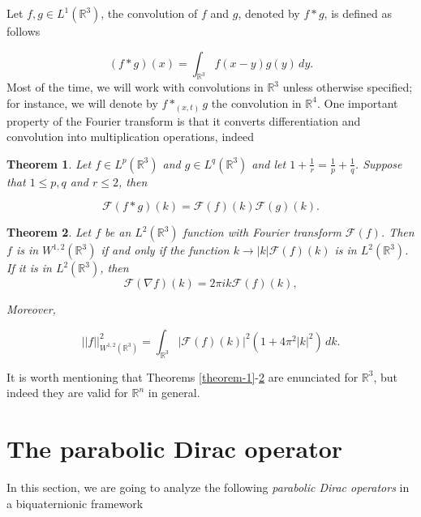 \documentclass[12pt]{article}
\newtheorem{theorem}{Theorem}
\def\R{\mathbb{R}}
\def\R{\mathbb{R}}
\newcommand{\norm}[1]{\left|\left| #1 \right|\right|}
\newcommand{\fourier}[1]{\mathcal{F}\left( #1 \right)}
\begin{document}
Let $f,g\in L^1(\R^3)$, the convolution of $f$ and $g$, denoted by $f*g$, is defined as follows

\begin{equation*}
    (f\ast g)(x)=\int_{\R^3} f(x-y)g(y)\, dy.
\end{equation*}
Most of the time, we will work with convolutions in $\mathbb{R}^3$ unless otherwise specified; for instance, we will denote by $f\ast_{(x,t)} g$ the convolution in $\mathbb{R}^4$.
One important property of the Fourier transform is that it converts differentiation and convolution into multiplication operations, indeed
\begin{theorem}{\cite[Th.\ 5.8]{lieb2001analysis}}\label{theorem-2}
    Let $f\in L^p(\R^3)$ and $g\in L^q(\R^3)$ and let $1+\tfrac{1}{r}=\frac{1}{p}+\frac{1}{q}$. Suppose that $1\leq p,q$ and $r\leq 2$, then
    
    \begin{equation}\label{eq:convolution}
        \fourier{f\ast g}(k)=\fourier{f}(k)\fourier{g}(k).
    \end{equation}    
\end{theorem}

\begin{theorem}{\cite[Th. ~7.9]{lieb2001analysis}}\label{theorem-3}
    Let $f$ be an $L^2(\R^3)$ function with Fourier transform $\fourier{f}$. Then $f$ is in $W^{1,2}(\R^3)$ if and only if the function $k\to |k|\fourier{f}(k)$ is in $L^2(\R^3)$. If it is in $L^2(\R^3)$, then
    \begin{equation}\label{eq:action-gradient}
        \fourier{\nabla f}(k)=2\pi ik\fourier{f}(k),
    \end{equation}
    
    Moreover,
    
    \begin{equation*}
        \norm{f}^2_{W^{1,2}(\R^3)}=\int_{\R^3}|\fourier{f}(k)|^2(1+4\pi^2|k|^2)\,dk.
    \end{equation*}
\end{theorem}

It is worth mentioning that Theorems \ref{theorem-1}-\ref{theorem-3} are enunciated for $\R^3$, but indeed they are valid for $\R^n$ in general.


\section{The parabolic Dirac operator}\label{sec:parabolic-Dirac-operator}
In this section, we are going to analyze the following \textit{parabolic Dirac operators} in a biquaternionic framework
\end{document}
